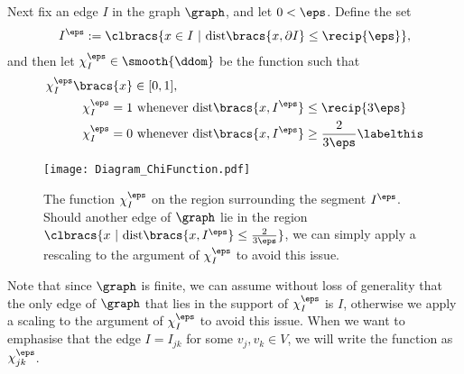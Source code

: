 Next fix an edge $I$ in the graph $\graph$, and let $0<\eps$.
Define the set 
\begin{align} \label{eq:ShortenedIntervalDef}
	I^{\eps} := \clbracs{ x\in I \ \vert \ \mathrm{dist}\bracs{x, \partial I}\leq \recip{\eps}},
\end{align}
and then let $\chi_{I}^\eps\in\smooth{\ddom}$ be the function such that 
\begin{align*}
	\chi_I^\eps\bracs{x} &\in [0,1], \\
	\chi_I^\eps = 1 &\text{ whenever } \mathrm{dist}\bracs{x, I^\eps}\leq \recip{3\eps} \\
	\chi_I^\eps = 0 &\text{ whenever } \mathrm{dist}\bracs{x, I^\eps}\geq \frac{2}{3\eps} \labelthis\label{eq:ChiDef}
\end{align*}
\begin{figure}[t!]
	\centering
	\texttt{[image: Diagram\_ChiFunction.pdf]}
	\caption{\label{fig:chiDiagram} The function $\chi_I^\eps$ on the region surrounding the segment $I^\eps$. Should another edge of $\graph$ lie in the region $\clbracs{x \ \vert \ \mathrm{dist}\bracs{x,I^\eps}\leq\frac{2}{3\eps}}$, we can simply apply a rescaling to the argument of $\chi_I^\eps$ to avoid this issue.}
\end{figure}
Note that since $\graph$ is finite, we can assume without loss of generality that the only edge of $\graph$ that lies in the support of $\chi_I^\eps$ is $I$, otherwise we apply a scaling to the argument of $\chi_I^\eps$ to avoid this issue.
When we want to emphasise that the edge $I=I_{jk}$ for some $v_j, v_k\in V$, we will write the function as $\chi_{jk}^\eps$.

